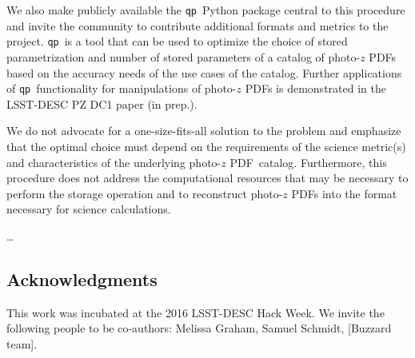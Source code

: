 \documentclass[\docopts]{\docclass}
\newcommand{\qp}{\texttt{qp}}
\newcommand{\pz}{photo-$z$ PDF}
\begin{document}
We also make publicly available the \qp\ Python package central to this 
procedure and invite the community to contribute additional formats and metrics 
to the project.  \qp\ is a tool that can be used to optimize the choice of 
stored parametrization and number of stored parameters of a catalog of \pz s 
based on the accuracy needs of the use cases of the catalog.  Further 
applications of \qp\ functionality for manipulations of \pz s is demonstrated 
in the LSST-DESC PZ DC1 paper (in prep.).

We do not advocate for a one-size-fits-all solution to the problem and 
emphasize that the optimal choice must depend on the requirements of the 
science metric(s) and characteristics of the underlying \pz\ catalog.  
Furthermore, this procedure does not address the computational resources that 
may be necessary to perform the storage operation and to reconstruct \pz s into 
the format necessary for science calculations.

\dots


\subsection*{Acknowledgments}


This work was incubated at the 2016 LSST-DESC Hack Week.  We invite the 
following people to be co-authors: Melissa Graham, Samuel Schmidt, [Buzzard 
team].  







\end{document}
